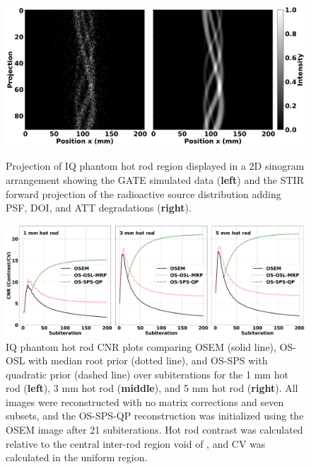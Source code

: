 \documentclass[utf8]{FrontiersinHarvard} %
\begin{document}
\begin{figure}[h!]
\begin{center}
\includegraphics[height=6cm]{Figures/HotRod_sinograms_y130}
\end{center}
\caption{Projection of IQ phantom hot rod region displayed in a 2D sinogram arrangement showing the GATE simulated data (\textbf{left}) and the STIR forward projection of the radioactive source distribution adding PSF, DOI, and ATT degradations (\textbf{right}).}
\label{fig:PinholeSPECTUB_coords}
\end{figure}


\begin{figure}[h!]
\begin{center}
\includegraphics[width=\textwidth]{Figures/HotRod_CNR}
\end{center}
\caption{IQ phantom hot rod CNR plots comparing OSEM (solid line), OS-OSL with median root prior (dotted line), and OS-SPS with quadratic prior (dashed line) over subiterations for the 1 mm hot rod (\textbf{left}), 3 mm hot rod (\textbf{middle}), and 5 mm hot rod (\textbf{right}). All images were reconstructed with no matrix corrections and seven subsets, and the OS-SPS-QP reconstruction was initialized using the OSEM image after 21 subiterations. Hot rod contrast was calculated relative to the central inter-rod region void of , and CV was calculated in the uniform  region.}
\label{fig:CNR}
\end{figure}
\end{document}
